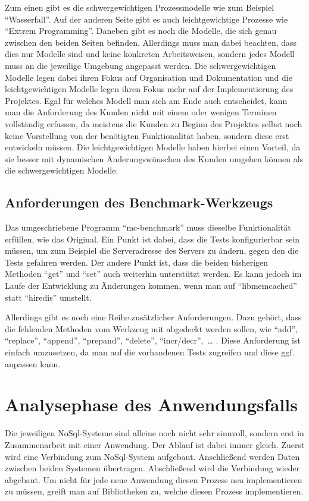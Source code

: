 Zum einen gibt es die schwergewichtigen Prozessmodelle wie zum Beispiel
\enquote{Wasserfall}. Auf der anderen Seite gibt es auch leichtgewichtige
Prozesse wie \enquote{Extrem Programming}. Daneben gibt es noch die Modelle,
die sich genau zwischen den beiden Seiten befinden. Allerdings muss man dabei
beachten, dass dies nur Modelle sind und keine konkreten Arbeitsweisen, sondern
jedes Modell muss an die jeweilige Umgebung angepasst werden. Die
schwergewichtigen Modelle legen dabei ihren Fokus auf Organisation und
Dokumentation und die leichtgewichtigen Modelle legen ihren Fokus mehr auf der
Implementierung des Projektes. Egal für welches Modell man sich am Ende auch
entscheidet, kann man die Anforderung des Kunden nicht mit einem oder wenigen
Terminen vollständig erfassen, da meistens die Kunden zu Beginn des Projektes
selbst noch keine Vorstellung von der benötigten Funktionalität haben, sondern
diese erst entwickeln müssen. Die leichtgewichtigen Modelle haben hierbei einen
Vorteil, da sie besser mit dynamischen Änderungswünschen des Kunden umgehen
können als die schwergewichtigen Modelle.

\subsection{Anforderungen des Benchmark-Werkzeugs}
Das umgeschriebene Programm \enquote{mc-benchmark} muss dieselbe Funktionalität
erfüllen, wie das Original. Ein Punkt ist dabei, dass die Tests konfigurierbar
sein müssen, um zum Beispiel die Serveradresse des Servers zu ändern, gegen den
die Tests gefahren werden. Der andere Punkt ist, dass die beiden bisherigen
Methoden \enquote{get} und \enquote{set} auch weiterhin unterstützt werden. Es
kann jedoch im Laufe der Entwicklung zu Änderungen kommen, wenn man auf
\enquote{libmemcached} statt \enquote{hiredis} umstellt.

Allerdings gibt es noch eine Reihe zusätzlicher Anforderungen. Dazu gehört,
dass die fehlenden Methoden vom Werkzeug mit abgedeckt werden sollen, wie
\enquote{add}, \enquote{replace}, \enquote{append}, \enquote{prepand},
\enquote{delete}, \enquote{incr/decr},~\dots{} . Diese Anforderung ist einfach
umzusetzen, da man auf die vorhandenen Tests zugreifen und diese ggf. anpassen
kann.

\section{Analysephase des Anwendungsfalls}
Die jeweiligen NoSql-Systeme sind alleine noch nicht sehr sinnvoll, sondern erst
in Zusammenarbeit mit einer Anwendung. Der Ablauf ist dabei immer gleich. Zuerst
wird eine Verbindung zum NoSql-System aufgebaut. Anschließend werden Daten
zwischen beiden Systemen übertragen. Abschließend wird die Verbindung wieder
abgebaut. Um nicht für jede neue Anwendung diesen Prozess neu implementieren zu
müssen, greift man auf Bibliotheken zu, welche diesen Prozess implementieren.

